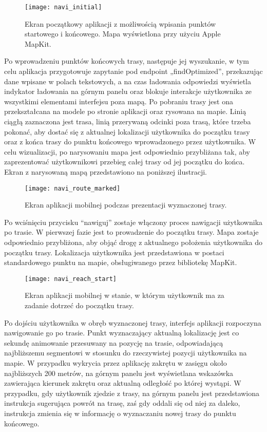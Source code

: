\begin{figure}[H]
\centering
\texttt{[image: navi\_initial]}
\caption{Ekran początkowy aplikacji z możliwością wpisania punktów startowego i końcowego. Mapa wyświetlona przy użyciu Apple MapKit.}
\end{figure}

Po wprowadzeniu punktów końcowych trasy, następuje jej wyszukanie, w tym celu aplikacja przygotowuje zapytanie pod endpoint „findOptimized”, przekazując dane wpisane w polach tekstowych, a na czas ładowania odpowiedzi wyświetla indykator ładowania na górnym panelu oraz blokuje interakcje użytkownika ze wszystkimi elementami interfejsu poza mapą. Po pobraniu trasy jest ona przekształcana na modele po stronie aplikacji oraz rysowana na mapie. Linią ciągłą zaznaczona jest trasa, linią przerywaną odcinki poza trasą, które trzeba pokonać, aby dostać się z aktualnej lokalizacji użytkownika do początku trasy oraz z końca trasy do punktu końcowego wprowadzonego przez użytkownika. W celu wizualizacji, po narysowaniu mapa jest odpowiednio przybliżana tak, aby zaprezentować użytkownikowi przebieg całej trasy od jej początku do końca. Ekran z narysowaną mapą przedstawiono na poniższej ilustracji.

\begin{figure}[H]
	\begin{center}
		\texttt{[image: navi\_route\_marked]}
	\end{center}
	\caption{Ekran aplikacji mobilnej podczas prezentacji wyznaczonej trasy.}
\end{figure}

Po wciśnięciu przycisku ``nawiguj'' zostaje włączony proces nawigacji użytkownika po trasie. W pierwszej fazie jest to prowadzenie do początku trasy. Mapa zostaje odpowiednio przybliżona, aby objąć drogę z aktualnego położenia użytkownika do początku trasy. Lokalizacja użytkownika jest przedstawiona w postaci standardowego punktu na mapie, obsługiwanego przez bibliotekę MapKit.

\begin{figure}[H]
\centering
\texttt{[image: navi\_reach\_start]}
\caption{Ekran aplikacji mobilnej w stanie, w którym użytkownik ma za zadanie dotrzeć do początku trasy.}
\end{figure}

Po dojściu użytkownika w obręb wyznaczonej trasy, interfejs aplikacji rozpoczyna nawigowanie go po trasie. Punkt wyznaczający aktualną lokalizację jest co sekundę animowanie przesuwany na pozycję na trasie, odpowiadającą najbliższemu segmentowi w stosunku do rzeczywistej pozycji użytkownika na mapie. W przypadku wykrycia przez aplikację zakrętu w zasięgu około najbliższych 200 metrów, na górnym panelu jest wyświetlana wskazówka zawierająca kierunek zakrętu oraz aktualną odległość po której wystąpi. W przypadku, gdy użytkownik zjedzie z trasy, na górnym panelu jest przedstawiona instrukcja sugerująca powrót na trasę, zaś gdy oddali się od niej za daleko, instrukcja zmienia się w informację o wyznaczaniu nowej trasy do punktu końcowego.

